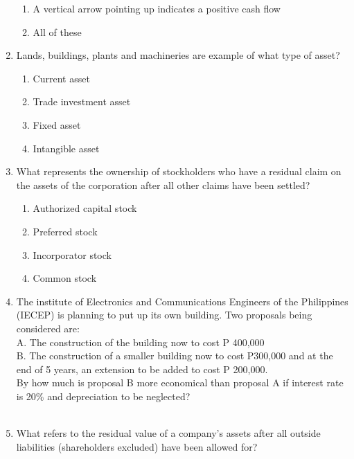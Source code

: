 \documentclass[11pt,a4paper]{article}
\begin{document}
\begin{enumerate}
\begin{enumerate}[label=\Alph*.]
\item{A vertical arrow pointing up indicates a positive cash flow}
\item{All of these}
\end{enumerate}
\item{Lands, buildings, plants and machineries are example of what type of asset?}
\begin{enumerate}[label=\Alph*.]
\item{Current asset}
\item{Trade investment asset}
\item{Fixed asset}
\item{Intangible asset}
\end{enumerate}
\item{What represents the ownership of stockholders who have a residual claim on the assets of the corporation after all other claims have been settled?}
\begin{enumerate}[label=\Alph*.]
\item{Authorized capital stock}
\item{Preferred stock}
\item{Incorporator stock}
\item{Common stock}
\end{enumerate}
\item{The institute of Electronics and Communications Engineers of the Philippines (IECEP) is planning to put up its own building. Two proposals being considered are: \\
A. The construction of the building now to cost P 400,000 \\
B. The construction of a smaller building now to cost P300,000 and at the end of 5 years, an extension to be added to cost P 200,000. \\
By how much is proposal B more economical than proposal A if interest rate is 20\% and depreciation to be neglected? \\
}
\\
\item{What refers to the residual value of a company's assets after all outside liabilities (shareholders excluded) have been allowed for?
}
\end{enumerate}
\end{document}
